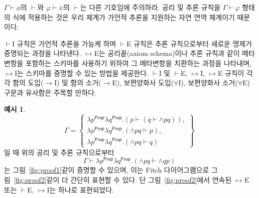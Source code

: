 \documentclass[10pt,twocolumn]{article}
\theoremstyle{definition}
\newtheorem{example}[theorem]{예시}
\newcommand{\Prop}{\mathsf{Prop}}
\begin{document}
$\Gamma\vdash\phi$의 $\vdash$와 $\varphi\vdash\psi$의 $\vdash$는 다른 기호임에 주의하라. 공리 및 추론 규칙을 $\Gamma\vdash\varphi$ 형태의 식에 적용하는 것은 우리 체계가 가언적 추론을 지원하는 자연 연역 체계이기 때문이다.

$\vdash$I 규칙은 가언적 추론을 가능케 하며 $\vdash$E 규칙은 추론 규칙으로부터 새로운 명제가 증명되는 과정을 나타낸다. $\mapsto$E는 공리꼴(axiom schema)이나 추론 규칙과 같이 메타변항을 포함하는 스키마를 사용하기 위하여 그 메타변항을 치환하는 과정을 나타내며, $\mapsto$I는 스키마를 증명할 수 있는 방법을 제공한다. $\vdash$I 및 $\vdash$E, $\mapsto$I, $\mapsto$E 규칙이 각각 함의 도입($\to$I) 및 함의 소거($\to$E), 보편양화사 도입($\forall$I), 보편양화사 소거($\forall$E) 구문과 유사함은 주목할 만하다.

\begin{example} \label{example:proof}
	$$\Gamma = \left\{\begin{array}{l}
		\lambda p^\Prop\lambda q^\Prop.(p\vdash(q\vdash {\land}pq)),\\
		\lambda p^\Prop\lambda q^\Prop.({\land}pq\vdash p),\\
		\lambda p^\Prop\lambda q^\Prop.({\land}pq\vdash q)
	\end{array}\right\}$$
	일 때 위의 공리 및 추론 규칙으로부터 $$\Gamma\vdash \lambda p^\Prop\lambda q^\Prop.({\land}pq\vdash{\land}qp)$$는 그림~\ref{fig:proof1}\과 같이 증명할 수 있으며, 이는 Fitch 다이어그램으로 그림~\ref{fig:proof2}\와 같이 더 간단히 표현할 수 있다. 단 그림~\ref{fig:proof2}에서 연속된 $\mapsto$E 또는 $\vdash$E, $\mapsto$I는 하나로 표현되었다.
	

\end{example}
\end{document}
